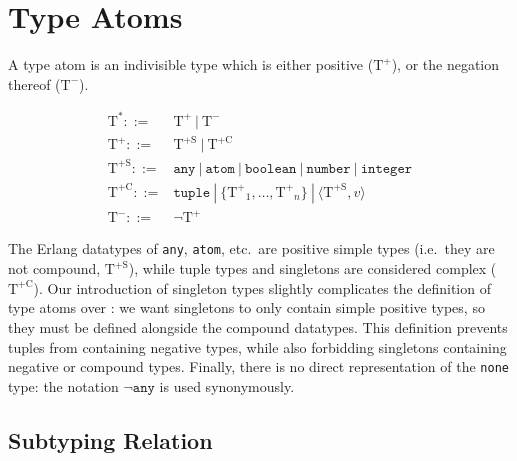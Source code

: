 \documentclass[nonacm,timestamp,manuscript]{acmart}
\newcommand{\alt}{\ |\ }
\newcommand{\atom}[1]{\texttt{#1}}
\newcommand{\singleton}[2]{\langle #1, #2 \rangle} %
\newcommand{\type}{\text{T}}
\newcommand{\atomtype}{{\type}^{*}}
\newcommand{\postype}{{\type}^{+}}
\newcommand{\posstype}{{\type}^{+\text{S}}}
\newcommand{\posctype}{{\type}^{+\text{C}}}
\newcommand{\negtype}{{\type}^{-}}
\begin{document}
\begin{definition}
\end{definition}


\section{Type Atoms}


\begin{definition}
  A type atom is an indivisible type which is either positive
  ($\postype$), or the negation thereof ($\negtype$).

\begin{align*}
  \atomtype ::={}& \postype \alt \negtype \\
  \postype ::={}& \posstype \alt \posctype \\
  \posstype ::={}& \atom{any} \alt \atom{atom} \alt \atom{boolean} \alt
                   \atom{number} \alt \atom{integer} \\
  \posctype ::={}& \atom{tuple} \alt \{ {\postype}_{1}, \ldots, {\postype}_{n} \}
                   \alt \singleton{\posstype}{v} \\
  \negtype ::={}& \neg \postype
\end{align*}
\end{definition}

The Erlang datatypes of \atom{any}, \atom{atom}, etc.\ are positive simple types
(i.e.\ they are not compound, $\posstype$), while tuple types and singletons are
considered complex ($\posctype$). Our introduction of singleton types slightly
complicates the definition of type atoms over \citeauthor{Pearce2013}: we want
singletons to only contain simple positive types, so they must be defined
alongside the compound datatypes. This definition prevents tuples from
containing negative types, while also forbidding singletons containing
negative or compound types. Finally, there is no direct representation of the
\atom{none} type: the notation $\neg \atom{any}$ is used synonymously.

\subsection{Subtyping Relation}
\end{document}
